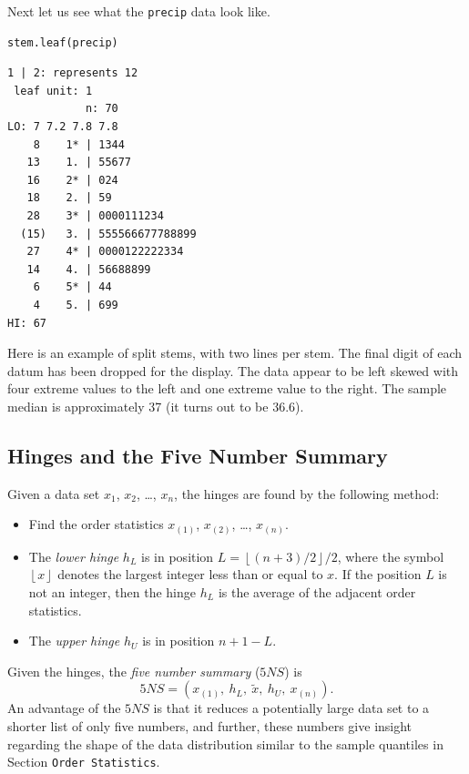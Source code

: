 \documentclass[10pt,english]{scrbook}
\begin{document}
Next let us see what the \texttt{precip} data look like.

\begin{verbatim}
stem.leaf(precip)
\end{verbatim}

\begin{verbatim}
1 | 2: represents 12
 leaf unit: 1
            n: 70
LO: 7 7.2 7.8 7.8
    8    1* | 1344
   13    1. | 55677
   16    2* | 024
   18    2. | 59
   28    3* | 0000111234
  (15)   3. | 555566677788899
   27    4* | 0000122222334
   14    4. | 56688899
    6    5* | 44
    4    5. | 699
HI: 67
\end{verbatim}

Here is an example of split stems, with two lines per stem. The final digit of each datum has been dropped for the display. The data appear to be left skewed with four extreme values to the left and one extreme value to the right. The sample median is approximately 37 (it turns out to be 36.6).
\subsection[Hinges and the Five Number Summary]{Hinges and the Five Number Summary}
\label{sec-1-4-2}

Given a data set \(x_{1}\), \(x_{2}\), \ldots{}, \(x_{n}\), the hinges are found by the following method:  
\begin{itemize}
\item Find the order statistics \(x_{(1)}\), \(x_{(2)}\), \ldots{}, \(x_{(n)}\).
\item The \emph{lower hinge} \(h_{L}\) is in position \(L=\left\lfloor (n+3)/2\right\rfloor / 2\), where the symbol \( \left\lfloor x\right\rfloor \) denotes the largest integer less than or equal to \(x\). If the position \(L\) is not an integer, then the hinge \(h_{L}\) is the average of the adjacent order statistics.
\item The \emph{upper hinge} \(h_{U}\) is in position \(n+1-L\).
\end{itemize}
Given the hinges, the \emph{five number summary} (\(5NS\)) is 
\begin{equation} 
5NS=(x_{(1)},\ h_{L},\ \tilde{x},\ h_{U},\ x_{(n)}).
\end{equation}
An advantage of the \(5NS\) is that it reduces a potentially large data set to a shorter list of only five numbers, and further, these numbers give insight regarding the shape of the data distribution similar to the sample quantiles in Section \texttt{Order Statistics}.
\end{document}

